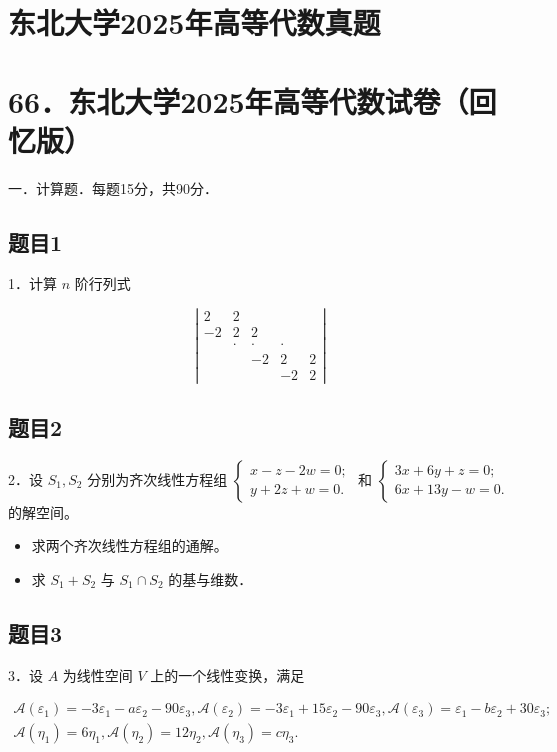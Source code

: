 \documentclass{article}
\begin{document}
\section*{东北大学2025年高等代数真题}
\section*{66．东北大学2025年高等代数试卷（回忆版）}
一．计算题．每题15分，共90分．\\

\subsection{题目1}
1．计算 \(n\) 阶行列式

\[
\left|\begin{array}{ccccc}
2 & 2 & & & \\
-2 & 2 & 2 & & \\
& \cdot & \cdot & \cdot & \\
& & -2 & 2 & 2 \\
& & & -2 & 2
\end{array}\right|
\]

\subsection{题目2}
2．设 \(S_{1}, S_{2}\) 分别为齐次线性方程组 \(\left\{\begin{array}{l}x-z-2 w=0 ; \\ y+2 z+w=0 .\end{array}\right.\) 和 \(\left\{\begin{array}{l}3 x+6 y+z=0 ; \\ 6 x+13 y-w=0 .\end{array}\right.\) 的解空间。

\begin{itemize}
  \item[（1）] 求两个齐次线性方程组的通解。
  \item[（2）] 求 \(S_{1}+S_{2}\) 与 \(S_{1} \cap S_{2}\) 的基与维数．
\end{itemize}

\subsection{题目3}
3．设 \(A\) 为线性空间 \(V\) 上的一个线性变换，满足

\[
\begin{gathered}
\mathcal{A}\left(\varepsilon_{1}\right)=-3 \varepsilon_{1}-a \varepsilon_{2}-90 \varepsilon_{3}, \mathcal{A}\left(\varepsilon_{2}\right)=-3 \varepsilon_{1}+15 \varepsilon_{2}-90 \varepsilon_{3}, \mathcal{A}\left(\varepsilon_{3}\right)=\varepsilon_{1}-b \varepsilon_{2}+30 \varepsilon_{3} ; \\
\mathcal{A}\left(\eta_{1}\right)=6 \eta_{1}, \mathcal{A}\left(\eta_{2}\right)=12 \eta_{2}, \mathcal{A}\left(\eta_{3}\right)=c \eta_{3} .
\end{gathered}
\]
\end{document}
